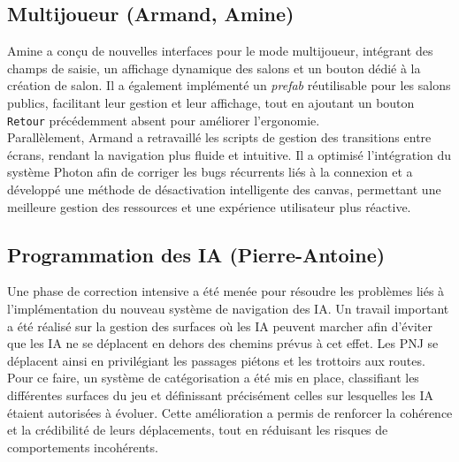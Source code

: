 \documentclass{report}
\begin{document}
\subsection*{Multijoueur (Armand, Amine)}
Amine a conçu de nouvelles interfaces pour le mode multijoueur, intégrant des champs de saisie, un affichage dynamique des salons et un bouton dédié à la création de salon. Il a également implémenté un \textit{prefab} réutilisable pour les salons publics, facilitant leur gestion et leur affichage, tout en ajoutant un bouton \texttt{Retour} précédemment absent pour améliorer l’ergonomie.
\\[0.4cm]
Parallèlement, Armand a retravaillé les scripts de gestion des transitions entre écrans, rendant la navigation plus fluide et intuitive. Il a optimisé l’intégration du système Photon afin de corriger les bugs récurrents liés à la connexion et a développé une méthode de désactivation intelligente des canvas, permettant une meilleure gestion des ressources et une expérience utilisateur plus réactive.

\subsection*{Programmation des IA (Pierre-Antoine)}
Une phase de correction intensive a été menée pour résoudre les problèmes liés à l’implémentation du nouveau système de navigation des IA. Un travail important a été réalisé sur la gestion des surfaces où les IA peuvent marcher afin d’éviter que les IA ne se déplacent en dehors des chemins prévus à cet effet. Les PNJ se déplacent ainsi en privilégiant les passages piétons et les trottoirs aux routes. Pour ce faire, un système de catégorisation a été mis en place, classifiant les différentes surfaces du jeu et définissant précisément celles sur lesquelles les IA étaient autorisées à évoluer. Cette amélioration a permis de renforcer la cohérence et la crédibilité de leurs déplacements, tout en réduisant les risques de comportements incohérents.
\end{document}
